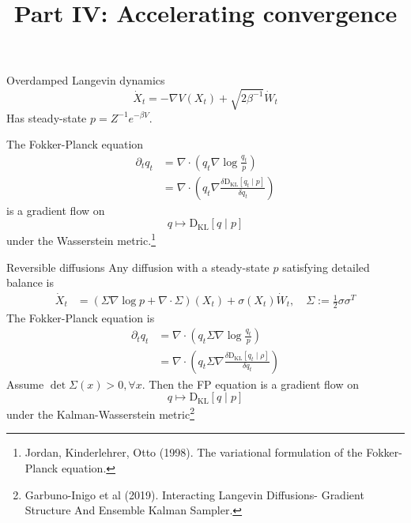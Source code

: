 \documentclass{beamer}
\newcommand{\dkl}{\operatorname{D_{K L}}}
\begin{document}
\begin{frame}{Overdamped Langevin dynamics}
    \begin{equation*}
        \dot X_{t}=-\nabla V\left(X_{t}\right)+ \sqrt{2\beta^{-1}}\dot W_{t}
    \end{equation*}
    Has steady-state $p = Z^{-1}e^{-\beta V}$.
    
    \vspace{10pt}
    The Fokker-Planck equation
\begin{equation*}
\begin{split}
     \partial_t q_t &= \nabla \cdot \left(q_t \nabla \log \frac{q_t}{p}\right)\\
     &= \nabla \cdot \left(q_t \nabla \frac{\delta \dkl[q_t\mid p]}{\delta q_t}\right)
\end{split}
\end{equation*}
    is a gradient flow on 
    $$q \mapsto \dkl[q \mid p]$$
    under the Wasserstein metric.\footnote{Jordan, Kinderlehrer, Otto (1998). The variational formulation of the Fokker-Planck equation.}
\end{frame}

\begin{frame}{Reversible diffusions}
Any diffusion with a steady-state $p$ satisfying detailed balance is
\begin{align*}
    \dot X_{t}&=(\Sigma \nabla \log p+\nabla \cdot \Sigma)\left(X_{t}\right)+\sigma (X_t) \dot  W_{t}, \quad \Sigma := \frac{1}{2 }\sigma \sigma^T
\end{align*}
The Fokker-Planck equation is
\begin{equation*}
\begin{split}
     \partial_t q_t &= \nabla \cdot \left(q_t \Sigma \nabla \log \frac{q_t}{p}\right)\\
     &= \nabla \cdot \left(q_t \Sigma \nabla \frac{\delta \dkl[q_t\mid \rho]}{\delta q_t}\right)
\end{split}
\end{equation*}
Assume $\operatorname{det}\Sigma(x) >0, \forall x$. Then the FP equation is a gradient flow on
$$q \mapsto \dkl[q \mid p]$$
under the Kalman-Wasserstein metric\footnote{Garbuno-Inigo et al (2019). Interacting Langevin Diffusions- Gradient Structure And Ensemble Kalman Sampler.}
\end{frame}


\begin{frame}{}
\title{Part IV: Accelerating convergence}
\author{\vspace{-5ex}}
\institute{\vspace{-5ex}}
\date{\vspace{-5ex}}
    \maketitle
    \small
\end{frame}
\end{document}
